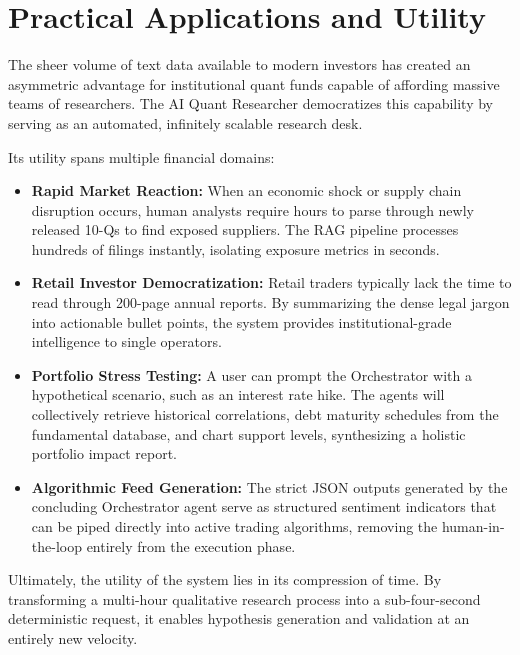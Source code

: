 \section{Practical Applications and Utility}

The sheer volume of text data available to modern investors has created an asymmetric advantage for institutional quant funds capable of affording massive teams of researchers. The AI Quant Researcher democratizes this capability by serving as an automated, infinitely scalable research desk.

Its utility spans multiple financial domains:
\begin{itemize}
    \item \textbf{Rapid Market Reaction:} When an economic shock or supply chain disruption occurs, human analysts require hours to parse through newly released 10-Qs to find exposed suppliers. The RAG pipeline processes hundreds of filings instantly, isolating exposure metrics in seconds.
    \item \textbf{Retail Investor Democratization:} Retail traders typically lack the time to read through 200-page annual reports. By summarizing the dense legal jargon into actionable bullet points, the system provides institutional-grade intelligence to single operators.
    \item \textbf{Portfolio Stress Testing:} A user can prompt the Orchestrator with a hypothetical scenario, such as an interest rate hike. The agents will collectively retrieve historical correlations, debt maturity schedules from the fundamental database, and chart support levels, synthesizing a holistic portfolio impact report.
    \item \textbf{Algorithmic Feed Generation:} The strict JSON outputs generated by the concluding Orchestrator agent serve as structured sentiment indicators that can be piped directly into active trading algorithms, removing the human-in-the-loop entirely from the execution phase.
\end{itemize}

Ultimately, the utility of the system lies in its compression of time. By transforming a multi-hour qualitative research process into a sub-four-second deterministic request, it enables hypothesis generation and validation at an entirely new velocity.
